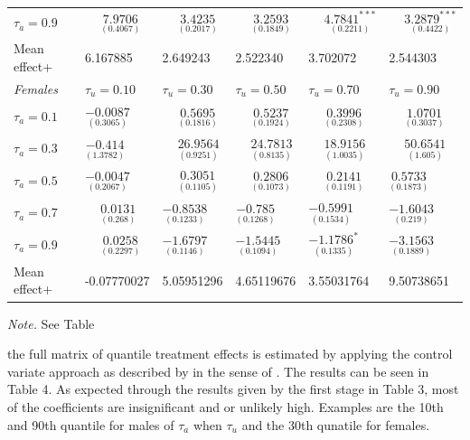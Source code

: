 \documentclass[12pt,a4paper]{article}
\begin{document}
\begin{table}[!htbp]
\begin{threeparttable}
\begin{tabular}{*{6}{l}}
           $\tau_a = 0.9$    & $\phantom{-}\underset{(0.4067)}{7.9706}$ & $\phantom{-}\underset{(0.2017)}{3.4235}$ & $\phantom{-}\underset{(0.1849)}{3.2593}$ & $\phantom{-}\underset{(0.2211)}{4.7841^{***}}$ & $\phantom{-}\underset{(0.4422)}{3.2879^{***}}$ 
\\ 
Mean effect+ &6.167885 & 2.649243 & 2.522340 &  3.702072 &  2.544303
\\ \toprule
        \textit{Females} &  \( \tau_u=0.10\) & \( \tau_u= 0.30\) & \( \tau_u= 0.50\) & \( \tau_u= 0.70\) & \( \tau_u= 0.90\) \\
        \midrule
        \addlinespace
        $\tau_a = 0.1$ & $\underset{(0.3065)}{-0.0087}$ & $\phantom{-}\underset{(0.1816)}{0.5695}$ & $\phantom{-}\underset{(0.1924)}{0.5237}$ & $\phantom{-}\underset{(0.2308)}{0.3996}$ & $\phantom{-}\underset{(0.3037)}{1.0701}$   \\
         $\tau_a = 0.3$   & $\underset{(1.3782)}{-0.414}$ & $\phantom{-}\underset{(0.9251)}{26.9564}$ & $\phantom{-}\underset{(0.8135)}{24.7813}$ & $\phantom{-}\underset{(1.0035)}{18.9156}$ & $\phantom{-}\underset{(1.605)}{50.6541}$ \\
          $\tau_a = 0.5$   & $\underset{(0.2067)}{-0.0047}$ & $\phantom{-}\underset{(0.1105)}{0.3051}$ & $\phantom{-}\underset{(0.1073)}{0.2806}$ & $\phantom{-}\underset{(0.1191)}{0.2141}$ & $\underset{(0.1873)}{0.5733}$   \\
           $\tau_a = 0.7$   &  $\phantom{-}\underset{(0.268)}{0.0131}$ & $\underset{(0.1233)}{-0.8538}$ & $\underset{(0.1268)}{-0.785}$ & $\underset{(0.1534)}{-0.5991}$ & $\underset{(0.219)}{-1.6043}$    \\
           $\tau_a = 0.9$    & $\phantom{-}\underset{(0.2297)}{0.0258}$ & $\underset{(0.1146)}{-1.6797}$ & $\underset{(0.1094)}{-1.5445}$ & $\underset{(0.1335)}{-1.1786^{*}}$ & $\underset{(0.1889)}{-3.1563}$    \\
           Mean effect+ & -0.07770027 &  5.05951296 & 4.65119676 &  3.55031764 & 9.50738651 \\
        \bottomrule
     \end{tabular}
    \begin{tablenotes}[flushleft]
      \small
      \item \textit{Note.} See Table 
    \end{tablenotes}
  \end{threeparttable}
\end{table}

the full matrix of quantile treatment effects is estimated by applying
the control variate approach as described by \textcite{MaKoenk} in the
sense of \textcite{brunello}. The results can be seen in Table 4. As
expected through the results given by the first stage in Table 3, most
of the coefficients are insignificant and or unlikely high. Examples are
the 10th and 90th quantile for males of \(\tau_a\) when \(\tau_u\) and
the 30th qunatile for females.
\end{document}
